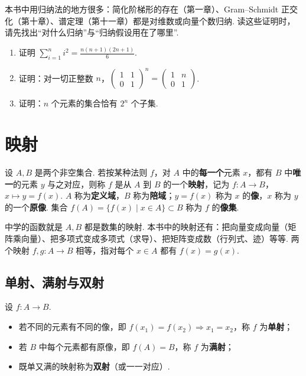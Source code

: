 本书中用归纳法的地方很多：简化阶梯形的存在（第一章）、Gram–Schmidt 正交化（第十章）、谱定理（第十一章）都是对维数或向量个数归纳. 读这些证明时，请先找出“对什么归纳”与“归纳假设用在了哪里”.

\begin{exercise}\label{exo:prelim-ind}
	\begin{enumerate}
		\item 证明 $\displaystyle\sum_{i=1}^n i^2=\frac{n(n+1)(2n+1)}6$.
		\item 证明：对一切正整数 $n$，$\begin{pmatrix}1&1\\0&1\end{pmatrix}^n=\begin{pmatrix}1&n\\0&1\end{pmatrix}$.
		\item 证明：$n$ 个元素的集合恰有 $2^n$ 个子集.
	\end{enumerate}
\end{exercise}

\section{映射}\label{app:map}

\begin{definition}
	设 $A,B$ 是两个非空集合. 若按某种法则 $f$，对 $A$ 中的\textbf{每一个}元素 $x$，都有 $B$ 中\textbf{唯一}的元素 $y$ 与之对应，则称 $f$ 是从 $A$ 到 $B$ 的一个\textbf{映射}，记为 $f:A\to B$，$x\mapsto y=f(x)$. $A$ 称为\textbf{定义域}，$B$ 称为\textbf{陪域}；$y=f(x)$ 称为 $x$ 的\textbf{像}，$x$ 称为 $y$ 的一个\textbf{原像}. 集合 $f(A)=\{f(x)\mid x\in A\}\subset B$ 称为 $f$ 的\textbf{像集}.
\end{definition}

中学的函数就是 $A,B$ 都是数集的映射. 本书中的映射还有：把向量变成向量（矩阵乘向量）、把多项式变成多项式（求导）、把矩阵变成数（行列式、迹）等等. 两个映射 $f,g:A\to B$ 相等，指对每个 $x\in A$ 都有 $f(x)=g(x)$.

\subsection{单射、满射与双射}

\begin{definition}
	设 $f:A\to B$.
	\begin{itemize}
		\item 若不同的元素有不同的像，即 $f(x_1)=f(x_2)\Rightarrow x_1=x_2$，称 $f$ 为\textbf{单射}；
		\item 若 $B$ 中每个元素都有原像，即 $f(A)=B$，称 $f$ 为\textbf{满射}；
		\item 既单又满的映射称为\textbf{双射}（或一一对应）.
	\end{itemize}
\end{definition}

